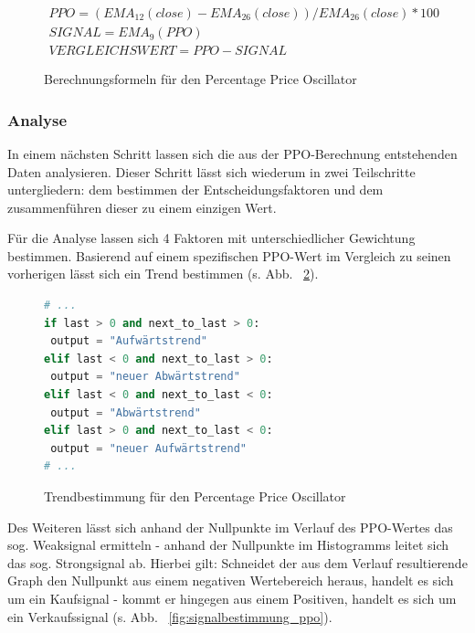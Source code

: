 \begin{figure}[!ht]
\begin{gather*} 
PPO = ( EMA_{12}(close) - EMA_{26}(close) ) / EMA_{26}(close) * 100 \\ 
SIGNAL =  EMA_9( PPO )\\
VERGLEICHSWERT = PPO - SIGNAL
\end{gather*}
\caption{Berechnungsformeln für den Percentage Price Oscillator}
\label{fig:formular_ppo}
\end{figure}

\subsubsection{Analyse}
\label{subsec_analysis_ppo}
In einem nächsten Schritt lassen sich die aus der PPO-Berechnung entstehenden Daten analysieren. Dieser Schritt lässt sich wiederum in zwei Teilschritte untergliedern: dem bestimmen der Entscheidungsfaktoren und dem zusammenführen dieser zu einem einzigen Wert.

\label{subsubsec_analysis_calc_ppo}
Für die Analyse lassen sich 4 Faktoren mit unterschiedlicher Gewichtung bestimmen. Basierend auf einem spezifischen PPO-Wert im Vergleich zu seinen vorherigen lässt sich ein Trend bestimmen (s. Abb. ~\ref{fig:trendbestimmung_ppo}).

\begin{figure}[!ht]
\begin{lstlisting}[language=Python,numbers=auto]
# ...
if last > 0 and next_to_last > 0:
 output = "Aufwärtstrend"
elif last < 0 and next_to_last > 0:
 output = "neuer Abwärtstrend"
elif last < 0 and next_to_last < 0:
 output = "Abwärtstrend"
elif last > 0 and next_to_last < 0:
 output = "neuer Aufwärtstrend"
# ...
\end{lstlisting}
\caption{Trendbestimmung für den Percentage Price Oscillator}
\label{fig:trendbestimmung_ppo}
\end{figure}

Des Weiteren lässt sich anhand der Nullpunkte im Verlauf des PPO-Wertes das sog. Weaksignal ermitteln - anhand der Nullpunkte im Histogramms leitet sich das sog. Strongsignal ab. Hierbei gilt: Schneidet der aus dem Verlauf resultierende Graph den Nullpunkt aus einem negativen Wertebereich heraus, handelt es sich um ein Kaufsignal - kommt er hingegen aus einem Positiven, handelt es sich um ein Verkaufssignal (s. Abb. ~\ref{fig:signalbestimmung_ppo}).

